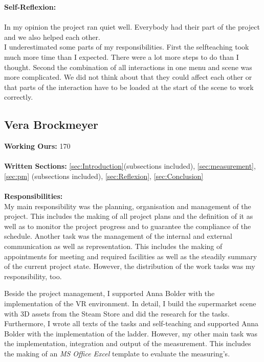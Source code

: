\textbf{Self-Reflexion:}\\ \\
In my opinion the project ran quiet well. Everybody had their part of the project and we also helped each other.\\
I underestimated some parts of my responsibilities. First the selfteaching took much more time than I expected. There were a lot more steps to do than I thought. Second the combination of all interactions in one menu and scene was more complicated. We did not think about that they could affect each other or that parts of the interaction have to be loaded at the start of the scene to work correctly.\\

\newpage
\subsection{Vera Brockmeyer} \label{sec:SAVera}


\textbf{Working Ours:} 170 \\ \\
\textbf{Written Sections: }\ref{sec:Introduction}(subsections included),  \ref{sec:measurement}, \ref{sec:pm} (subsections included), \ref{sec:Reflexion}, \ref{sec:Conclusion} \\ \\
\textbf{Responsibilities:}\\ 
My main responsibility was the planning, organisation and management of the project. This includes the making of all project plans and the definition of it as well as to monitor the project progress and to guarantee the compliance of the schedule. Another task was the management of the internal and external communication as well as representation. This includes the making of appointments for meeting and required facilities as well as the steadily summary of the current project state. However, the distribution of the work tasks was my responsibility, too.

Beside the project management, I supported Anna Bolder with the implementation of the VR environment. In detail, I build the supermarket scene with 3D assets from the Steam Store and did the research for the tasks. Furthermore, I wrote all texts of the tasks and self-teaching and supported Anna Bolder with the implementation of the ladder. However, my other main task was the implementation, integration and output of the measurement. This includes the making of an \textit{MS Office Excel} template to evaluate the measuring's.


